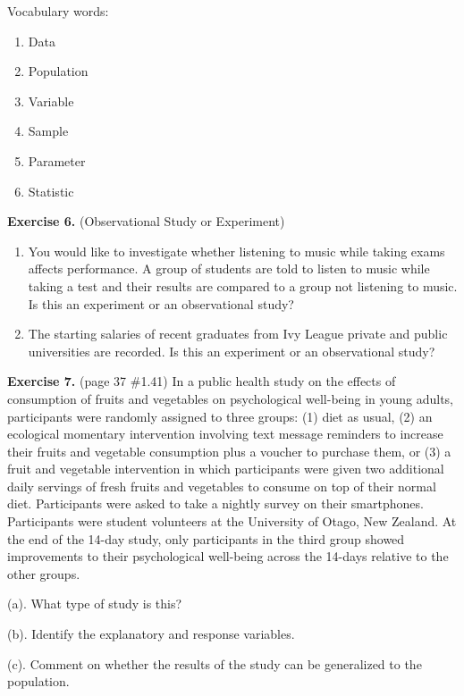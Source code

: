\documentclass[
]{book}
\begin{document}
Vocabulary words:

\begin{enumerate}
\def\labelenumi{\alph{enumi}.}
\item
  Data
\item
  Population
\item
  Variable
\item
  Sample
\item
  Parameter
\item
  Statistic
\end{enumerate}

\textbf{Exercise 6.} (Observational Study or Experiment)

\begin{enumerate}
\def\labelenumi{\alph{enumi}.}
\item
  You would like to investigate whether listening to music while taking exams affects performance. A group of students are told to listen to music while taking a test and their results are compared to a group not listening to music. Is this an experiment or an observational study?
\item
  The starting salaries of recent graduates from Ivy League private and public universities are recorded. Is this an experiment or an observational study?
\end{enumerate}

\textbf{Exercise 7.} (page 37 \#1.41) In a public health study on the effects of consumption of fruits and vegetables on psychological well-being in young adults, participants were randomly assigned to three groups: (1) diet as usual, (2) an ecological momentary intervention involving text message reminders to increase their fruits and vegetable consumption plus a voucher to purchase them, or (3) a fruit and vegetable intervention in which participants were given two additional daily servings of fresh fruits and vegetables to consume on top of their normal diet. Participants were asked to take a nightly survey on their smartphones. Participants were student volunteers at the University of Otago, New Zealand. At the end of the 14-day study, only participants in the third group showed improvements to their psychological well-being across the 14-days relative to the other groups.

(a). What type of study is this?

(b). Identify the explanatory and response variables.

(c). Comment on whether the results of the study can be generalized to the population.
\end{document}
